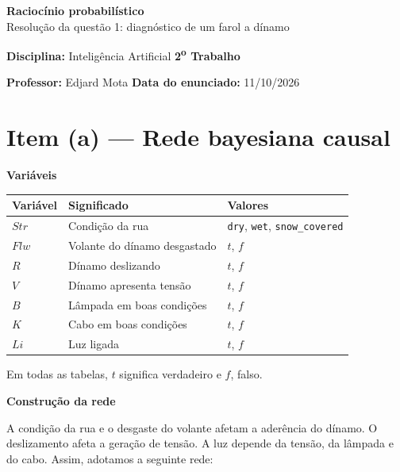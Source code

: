 \documentclass[11pt,a4paper]{article}
\newcommand{\itemtitle}[2]{\section*{\textcolor{accent}{Item (#1) --- #2}}}
\newcommand{\subtitulo}[1]{\par\medskip\textbf{\textcolor{accent}{#1}}\par}
\begin{document}
{\LARGE\bfseries\textcolor{accent}{Raciocínio probabilístico}}\\[4pt]
{\large Resolução da questão 1: diagnóstico de um farol a dínamo}

\textbf{Disciplina:} Inteligência Artificial \hfill \textbf{2\textsuperscript{o} Trabalho}\par
\textbf{Professor:} Edjard Mota \hfill \textbf{Data do enunciado:} 11/10/2026

\itemtitle{a}{Rede bayesiana causal}\label{item-a}

\subtitulo{Variáveis}\label{variuxe1veis}

{\def\LTcaptype{none} %
\begin{longtable}[]{@{}lll@{}}
\toprule\noalign{}
Variável & Significado & Valores \\
\midrule\noalign{}
\endhead
\bottomrule\noalign{}
\endlastfoot
\(Str\) & Condição da rua & \texttt{dry}, \texttt{wet}, \texttt{snow\_covered} \\
\(Flw\) & Volante do dínamo desgastado & \(t\), \(f\) \\
\(R\) & Dínamo deslizando & \(t\), \(f\) \\
\(V\) & Dínamo apresenta tensão & \(t\), \(f\) \\
\(B\) & Lâmpada em boas condições & \(t\), \(f\) \\
\(K\) & Cabo em boas condições & \(t\), \(f\) \\
\(Li\) & Luz ligada & \(t\), \(f\) \\
\end{longtable}
}

Em todas as tabelas, \(t\) significa verdadeiro e \(f\), falso.

\subtitulo{Construção da rede}\label{construuxe7uxe3o-da-rede}

A condição da rua e o desgaste do volante afetam a aderência do dínamo. O deslizamento afeta a geração de tensão. A luz depende da tensão, da lâmpada e do cabo. Assim, adotamos a seguinte rede:
\end{document}
